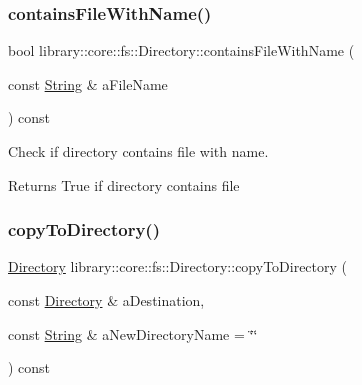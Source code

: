\subsubsection{\texorpdfstring{containsFileWithName()}{containsFileWithName()}}
{\footnotesize\ttfamily bool library\+::core\+::fs\+::\+Directory\+::contains\+File\+With\+Name (\begin{DoxyParamCaption}\item[{const \mbox{\hyperlink{classlibrary_1_1core_1_1types_1_1_string}{String}} \&}]{a\+File\+Name }\end{DoxyParamCaption}) const}



Check if directory contains file with name. 


\begin{DoxyCode}{0}
\end{DoxyCode}


\begin{DoxyReturn}{Returns}
True if directory contains file 
\end{DoxyReturn}
\mbox{\label{classlibrary_1_1core_1_1fs_1_1_directory_a47e5e9a14af43a55dd45283b62baf482}} 
\subsubsection{\texorpdfstring{copyToDirectory()}{copyToDirectory()}}
{\footnotesize\ttfamily \mbox{\hyperlink{classlibrary_1_1core_1_1fs_1_1_directory}{Directory}} library\+::core\+::fs\+::\+Directory\+::copy\+To\+Directory (\begin{DoxyParamCaption}\item[{const \mbox{\hyperlink{classlibrary_1_1core_1_1fs_1_1_directory}{Directory}} \&}]{a\+Destination,  }\item[{const \mbox{\hyperlink{classlibrary_1_1core_1_1types_1_1_string}{String}} \&}]{a\+New\+Directory\+Name = {\ttfamily \char`\"{}\char`\"{}} }\end{DoxyParamCaption}) const}



